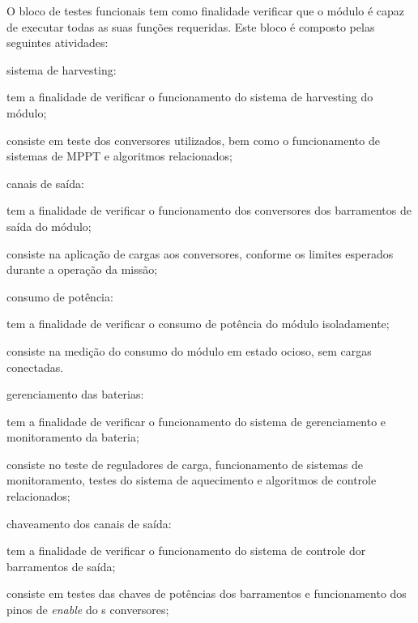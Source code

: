 O bloco de testes funcionais tem como finalidade verificar que o módulo é capaz de executar todas as suas funções requeridas.
Este bloco é composto pelas seguintes atividades:

\begin{alineas}
    \item sistema de harvesting:
    \begin{alineas}
        \item tem a finalidade de verificar o funcionamento do sistema de harvesting do módulo;
        \item consiste em teste dos conversores utilizados, bem como o funcionamento de sistemas de \gls{MPPT} e algoritmos relacionados;
    \end{alineas}

    \item canais de saída:
    \begin{alineas}
        \item tem a finalidade de verificar o funcionamento dos conversores dos barramentos de saída do módulo;
        \item consiste na aplicação de cargas aos conversores, conforme os limites esperados durante a operação da missão;
    \end{alineas}

    \item consumo de potência:
    \begin{alineas}
        \item tem a finalidade de verificar o consumo de potência do módulo isoladamente;
        \item consiste na medição do consumo do módulo em estado ocioso, sem cargas conectadas.
    \end{alineas}

    \item gerenciamento das baterias:
    \begin{alineas}
        \item tem a finalidade de verificar o funcionamento do sistema de gerenciamento e monitoramento da bateria;
        \item consiste no teste de reguladores de carga, funcionamento de sistemas de monitoramento, testes do sistema de aquecimento e algoritmos de controle relacionados;
    \end{alineas}

    \item chaveamento dos canais de saída:
    \begin{alineas}
        \item tem a finalidade de verificar o funcionamento do sistema de controle dor barramentos de saída;
        \item consiste em testes das chaves de potências dos barramentos e funcionamento dos pinos de \textit{enable} do s conversores;
    \end{alineas}


\end{alineas}
